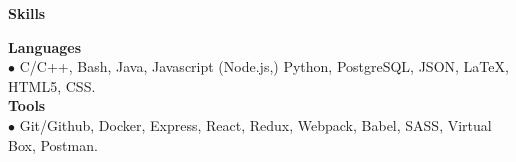 \documentclass[11pt]{article}
\newcommand{\sectionheader}[1]{\noindent \textbf{\large #1}}
\newenvironment{sectionbody}{\begin{adjustwidth}{6mm}{}}{\end{adjustwidth}}
\begin{document}
\vspace{2mm}

\sectionheader{Skills}
\begin{sectionbody}
{\bf Languages} \\
    $\bullet$ C/C++, Bash, Java, Javascript (Node.js,) Python, PostgreSQL, JSON, \LaTeX, HTML5, CSS. \\
{\bf Tools} \\
$\bullet$ Git/Github, Docker, Express, React, Redux, Webpack, Babel, SASS, Virtual Box, Postman.
\end{sectionbody}
\end{document}
